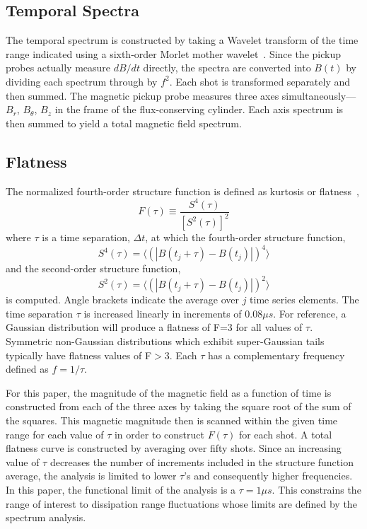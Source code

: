 \documentclass[aip,pop,amsmath,amssymb,preprint,superscriptaddress]{revtex4-1} %
\begin{document}
\subsection{Temporal Spectra}

The temporal spectrum is constructed by taking a Wavelet transform of the time range indicated using a sixth-order Morlet mother wavelet~\cite{brown2014}. Since the pickup probes actually measure $dB/dt$ directly, the spectra are converted into $B(t)$ by dividing each spectrum through by $f^2$. Each shot is transformed separately and then summed. The magnetic pickup probe measures three axes simultaneously---$B_{r}$, $B_{\theta}$, $B_{z}$ in the frame of the flux-conserving cylinder. Each axis spectrum is then summed to yield a total magnetic field spectrum.

\subsection{Flatness}
The normalized fourth-order structure function is defined as kurtosis or flatness~\cite{schaffner2015},
\begin{equation}
F(\tau) \equiv \frac{S^{4}(\tau)}{{[S^2(\tau)]^{2}}}
\label{eq:structfunc}
\end{equation}
where $\tau$ is a time separation, $\Delta t$, at which the fourth-order structure function,
\begin{equation}
S^{4}(\tau) = \langle(|B(t_{j}+\tau)-B(t_{j})|)^{4}\rangle
\label{eq:structfunc2}
\end{equation}
and the second-order structure function,
\begin{equation}
S^{2}(\tau) = \langle(|B(t_{j}+\tau)-B(t_{j})|)^{2}\rangle
\label{eq:structfunc3}
\end{equation}
is computed. Angle brackets indicate the average over $j$ time series elements. The time separation $\tau$ is increased linearly in increments of $0.08\mu s$. For reference, a Gaussian distribution will produce a flatness of F=3 for all values of $\tau$. Symmetric non-Gaussian distributions which exhibit super-Gaussian tails typically have flatness values of F$>$3. Each $\tau$ has a complementary frequency defined as $f = 1/\tau$. 

For this paper, the magnitude of the magnetic field as a function of time is constructed from each of the three axes by taking the square root of the sum of the squares. This magnetic magnitude then is scanned within the given time range for each value of $\tau$ in order to construct $F(\tau)$ for each shot. A total flatness curve is constructed by averaging over fifty shots. Since an increasing value of $\tau$ decreases the number of increments included in the structure function average, the analysis is limited to lower $\tau$'s and consequently higher frequencies. In this paper, the functional limit of the analysis is a $\tau = 1\mu s$. This constrains the range of interest to dissipation range fluctuations whose limits are defined by the spectrum analysis.
\end{document}
